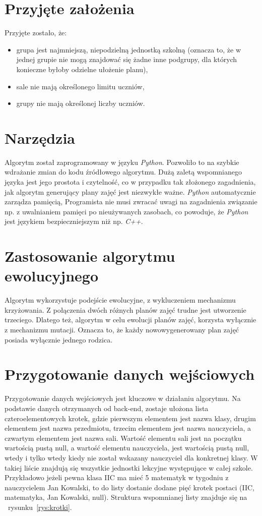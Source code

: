 \section{Przyjęte założenia}
Przyjęte zostało, że: 
\begin{itemize}
	\item grupa jest najmniejszą, niepodzielną jednostką szkolną (oznacza to, że w jednej grupie nie mogą znajdować się żadne inne podgrupy, dla których konieczne byłoby odzielne ułożenie planu),
	\item sale nie mają określonego limitu uczniów,
	\item grupy nie mają określonej liczby uczniów.
\end{itemize} 


\section{Narzędzia}
Algorytm został zaprogramowany w języku \textit{Python}. Pozwoliło to na szybkie wdrażanie zmian do kodu źródłowego algorytmu. Dużą zaletą wspomnianego języka jest jego prostota i czytelność, co w przypadku tak złożonego zagadnienia, jak algorytm generujący plany zajęć jest niezwykłe ważne. \textit{Python} automatycznie zarządza pamięcią, Programista nie musi zwracać uwagi na zagadnienia związanie np. z uwalnianiem pamięci po nieużywanych zasobach, co powoduje, że \textit{Python} jest językiem bezpieczniejszym niż np. \textit{C++}.

\section{Zastosowanie algorytmu ewolucyjnego}
Algorytm wykorzystuje podejście ewolucyjne, z wykluczeniem mechanizmu krzyżowania. Z połączenia dwóch różnych planów zajęć trudne jest utworzenie trzeciego. Dlatego też, algorytm w celu ewolucji planów zajęć, korzysta wyłącznie z mechanizmu mutacji. Oznacza to, że każdy nowowygenerowany plan zajęć posiada wyłącznie jednego rodzica.

\section{Przygotowanie danych wejściowych}
    
    Przygotowanie danych wejściowych jest kluczowe w działaniu algorytmu. Na podstawie danych otrzymanych od back-end, zostaje ułożona lista czteroelementowych krotek, gdzie pierwszym elementem jest nazwa klasy, drugim elementem jest nazwa przedmiotu, trzecim elementem jest nazwa nauczyciela, a czwartym elementem jest nazwa sali. Wartość elementu sali jest na początku wartością pustą null, a wartość elementu nauczyciela, jest wartością pustą null, wtedy i tylko wtedy kiedy nie został wskazany nauczyciel dla konkretnej klasy. W takiej liście znajdują się wszystkie jednostki lekcyjne występujące w całej szkole. Przykładowo jeżeli pewna klasa IIC ma mieć 5 matematyk w tygodniu z nauczycielem Jan Kowalski, to do listy dostanie dodane pięć krotek postaci (IIC, matematyka, Jan Kowalski, null). Struktura wspomnianej listy znajduje się na ~rysunku~\ref{rys:krotki}.


